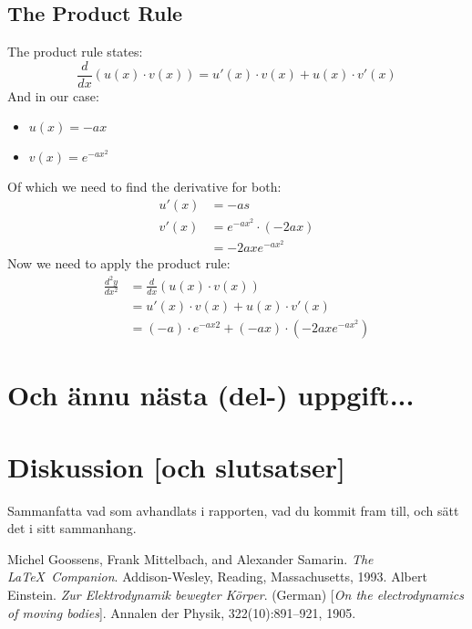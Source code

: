 \documentclass[a4paper,12pt]{article}
\begin{document}
\subsection*{The Product Rule}
The product rule states:
\begin{displaymath}
  \frac{d}{dx}\left(u\left(x\right) \cdot v\left(x\right)\right)
  = u'\left(x\right) \cdot v\left(x\right) + u\left(x\right) \cdot v'\left(x\right)
\end{displaymath}
And in our case:
\begin{itemize}
  \item $u\left(x\right) = -ax$
  \item $v\left(x\right) = e^{-ax^2}$
\end{itemize}
Of which we need to find the derivative for both:
\begin{equation}
  \begin{split}
    u'\left(x\right)  &= -as \\
    v'\left(x\right)  &= e^{-ax^2} \cdot \left(-2ax\right) \\
                      &= -2axe^{-ax^2}
  \end{split}
\end{equation}
Now we need to apply the product rule:
\begin{equation}
  \begin{split}
    \frac{d^2y}{dx^2} &= \frac{d}{dx}\left(u\left(x\right) \cdot 
                         v\left(x\right)\right) \\
                      &= u'\left(x\right) \cdot v\left(x\right) + u\left(x\right) \cdot v'\left(x\right) \\
                      &= \left(-a\right) \cdot e^{-ax2} + \left(-ax\right) \cdot \left(-2axe^{-ax^2}\right)
  \end{split}
\end{equation}
\section{Och ännu nästa (del-) uppgift...}
\label{sec:uppgN}

\section{Diskussion [och slutsatser]}
\label{sec:disk}

Sammanfatta vad som avhandlats i rapporten, vad du kommit fram till,
och sätt det i sitt sammanhang. 
%
\begin{thebibliography}{99}
%
Michel Goossens, Frank Mittelbach, and Alexander Samarin. 
\textit{The \LaTeX\ Companion}. 
Addison-Wesley, Reading, Massachusetts, 1993.
%
Albert Einstein. 
\textit{Zur Elektrodynamik bewegter K{\"o}rper}. (German) 
[\textit{On the electrodynamics of moving bodies}]. 
Annalen der Physik, 322(10):891–921, 1905.
%
\end{thebibliography}
%
\end{document}
